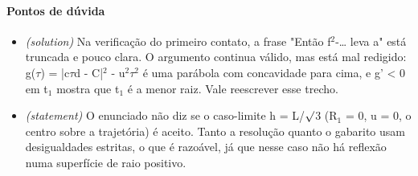 \documentclass{article}%
\begin{document}
\paragraph{Pontos de dúvida}%
\begin{itemize}%
\item%
\textit{(solution)} Na verificação do primeiro contato, a frase "Então f$^2$-\ldots{} leva a" está truncada e pouco clara. O argumento continua válido, mas está mal redigido: g($\tau$) = |c$\tau$d - C|$^2$ - u$^2$$\tau$$^2$ é uma parábola com concavidade para cima, e g' < 0 em t$_{1}$ mostra que t$_{1}$ é a menor raiz. Vale reescrever esse trecho.%
\item%
\textit{(statement)} O enunciado não diz se o caso{-}limite h = L/$\surd$3 (R$_{1}$ = 0, u = 0, o centro sobre a trajetória) é aceito. Tanto a resolução quanto o gabarito usam desigualdades estritas, o que é razoável, já que nesse caso não há reflexão numa superfície de raio positivo.%
\end{itemize}%
\end{document}
